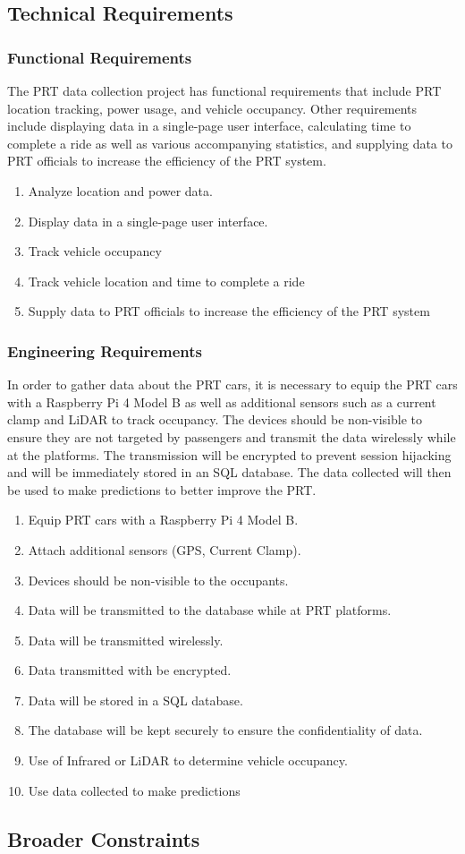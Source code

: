 \subsection{Technical Requirements}
\subsubsection{Functional Requirements}
The PRT data collection project has functional requirements that include PRT location tracking, power usage, and vehicle occupancy. 
Other requirements include displaying data in a single-page user interface, calculating time to complete a ride as well as various accompanying statistics, and supplying data to PRT officials to increase the efficiency of the PRT system.
\begin{enumerate}
    \item Analyze location and power data.
    \item Display data in a single-page user interface.
    \item Track vehicle occupancy
    \item Track vehicle location and time to complete a ride
    \item Supply data to PRT officials to increase the efficiency of the PRT system
\end{enumerate}
\subsubsection{Engineering Requirements}
In order to gather data about the PRT cars, it is necessary to equip the PRT cars with a Raspberry Pi 4 Model B as well as additional sensors such as a current clamp and LiDAR to track occupancy. 
The devices should be non-visible to ensure they are not targeted by passengers and transmit the data wirelessly while at the platforms. 
The transmission will be encrypted to prevent session hijacking and will be immediately stored in an SQL database. 
The data collected will then be used to make predictions to better improve the PRT.
\begin{enumerate}
    \item Equip PRT cars with a Raspberry Pi 4 Model B.
    \item Attach additional sensors (GPS, Current Clamp).
    \item Devices should be non-visible to the occupants.
    \item Data will be transmitted to the database while at PRT platforms.
    \item Data will be transmitted wirelessly.
    \item Data transmitted with be encrypted.
    \item Data will be stored in a SQL database.
    \item The database will be kept securely to ensure the confidentiality of data.
    \item Use of Infrared or LiDAR to determine vehicle occupancy.
    \item Use data collected to make predictions
\end{enumerate}

\subsection{Broader Constraints}
